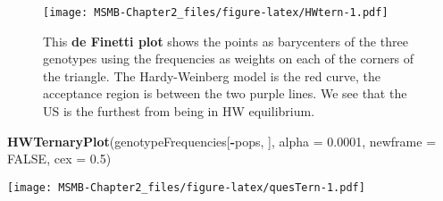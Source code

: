 \documentclass[]{article}
\newenvironment{Shaded}{\begin{snugshade}}{\end{snugshade}}
\newcommand{\KeywordTok}[1]{\textcolor[rgb]{0.13,0.29,0.53}{\textbf{#1}}}
\newcommand{\DataTypeTok}[1]{\textcolor[rgb]{0.13,0.29,0.53}{#1}}
\newcommand{\DecValTok}[1]{\textcolor[rgb]{0.00,0.00,0.81}{#1}}
\newcommand{\FloatTok}[1]{\textcolor[rgb]{0.00,0.00,0.81}{#1}}
\newcommand{\StringTok}[1]{\textcolor[rgb]{0.31,0.60,0.02}{#1}}
\newcommand{\OtherTok}[1]{\textcolor[rgb]{0.56,0.35,0.01}{#1}}
\newcommand{\OperatorTok}[1]{\textcolor[rgb]{0.81,0.36,0.00}{\textbf{#1}}}
\newcommand{\NormalTok}[1]{#1}
\begin{document}
\begin{Shaded}
\end{Shaded}

\begin{figure}
\centering
\texttt{[image: MSMB-Chapter2\_files/figure-latex/HWtern-1.pdf]}
\caption{This \textbf{de Finetti plot} shows the points as barycenters
of the three genotypes using the frequencies as weights on each of the
corners of the triangle. The Hardy-Weinberg model is the red curve, the
acceptance region is between the two purple lines. We see that the US is
the furthest from being in HW equilibrium.}
\end{figure}

\begin{Shaded}
\begin{Highlighting}[]
\KeywordTok{HWTernaryPlot}\NormalTok{(genotypeFrequencies[}\OperatorTok{-}\NormalTok{pops, ], }\DataTypeTok{alpha =} \FloatTok{0.0001}\NormalTok{,}
              \DataTypeTok{newframe =} \OtherTok{FALSE}\NormalTok{, }\DataTypeTok{cex =} \FloatTok{0.5}\NormalTok{)}
\end{Highlighting}
\end{Shaded}

\texttt{[image: MSMB-Chapter2\_files/figure-latex/quesTern-1.pdf]}

\begin{Shaded}
\end{Shaded}
\end{document}
